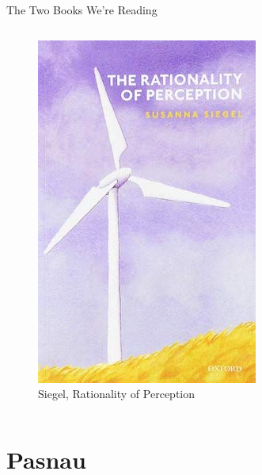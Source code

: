 \documentclass[
  17pt,
  letterpaper,
  ignorenonframetext,
  aspectratio=169,
]{beamer}
\begin{document}
\begin{frame}{The Two Books We're Reading}
\begin{columns}[T]
\begin{column}{0.48\textwidth}
\begin{figure}
{\centering \includegraphics[width=\textwidth,height=0.6\textheight]{../images/siegel_cover.jpeg}

}

\caption{Siegel, Rationality of Perception}

\end{figure}
\end{column}
\end{columns}
\end{frame}

\hypertarget{pasnau}{%
\section{Pasnau}\label{pasnau}}
\end{document}
